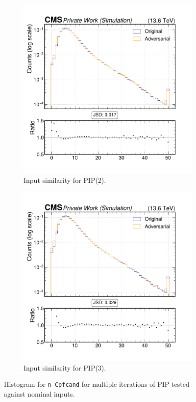 \begin{figure}[h]
\begin{subfigure}[t]{0.32\textwidth}
    \includegraphics[width=\linewidth]{media/output/features/compare/intprob_2/cmp_global_features_n_Cpfcand.pdf}
    \caption{Input similarity for PIP(2).}
  \end{subfigure}\hfill
  \begin{subfigure}[t]{0.32\textwidth}
    \includegraphics[width=\linewidth]{media/output/features/compare/intprob_3/cmp_global_features_n_Cpfcand.pdf}
    \caption{Input similarity for PIP(3).}
  \end{subfigure}

  \caption{Histogram for \texttt{n\_Cpfcand} for multiple iterations of PIP tested against nominal inputs.}
  \label{fig:intprob_input_n_Cpfcand}
\end{figure}

